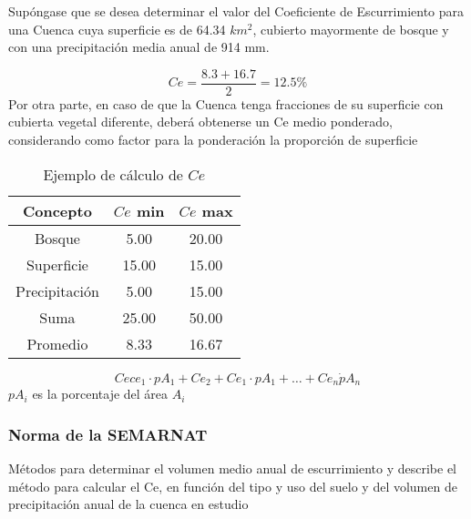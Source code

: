     \begin{example}
        Supóngase que se desea determinar el valor del Coeficiente de Escurrimiento para una Cuenca cuya superficie es de 64.34 $km^2$, cubierto mayormente de bosque y con una precipitación media anual de 914 mm.
      \end{example}
      
      \begin{equation*}
        Ce =\frac{8.3 + 16.7}{2} =12.5\%
      \end{equation*}
      Por otra parte, en caso de que la Cuenca tenga fracciones de su superficie con cubierta vegetal diferente, deberá obtenerse un Ce medio ponderado, considerando como factor para la ponderación la proporción de superficie
      \begin{table}[h!]
        \centering\begin{tabular}{@{}ccc@{}}
        \toprule
        Concepto      & $Ce$ min & $Ce$ max \\ \midrule
        Bosque        & 5.00     & 20.00    \\
        Superficie    & 15.00    & 15.00    \\
        Precipitación & 5.00     & 15.00    \\
        Suma          & 25.00    & 50.00    \\
        Promedio      & 8.33     & 16.67    \\ \bottomrule
        \end{tabular}
        \caption{Ejemplo de cálculo de $Ce$}
        \label{tabta15}
        \end{table}
      \begin{equation*}
        Ce ce_1\cdot pA_1+Ce_2 + Ce_1\cdot pA_1 +\dots + Ce_n\dot pA_n
      \end{equation*}
      $pA_i$ es la porcentaje del área $A_i$
      
      \subsubsection{Norma de la SEMARNAT}
      
      Métodos para determinar el volumen medio anual de escurrimiento y describe el método para calcular el Ce, en función del tipo y uso del suelo y del volumen de precipitación anual de la cuenca en estudio
      
